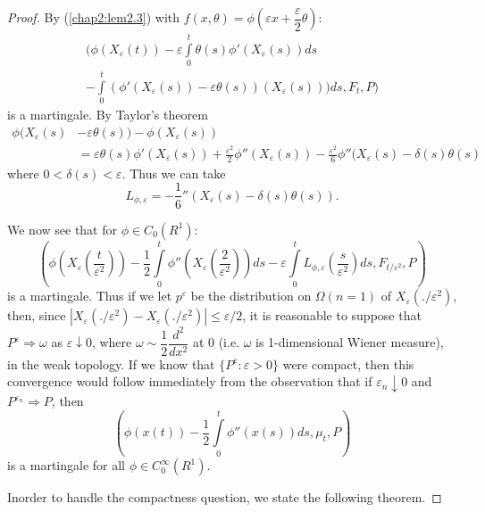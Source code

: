 \begin{proof}
By (\ref{chap2:lem2.3}) with $f(x, \theta) = \phi (\varepsilon x +
\dfrac{\varepsilon }{2} \theta)$: 
\begin{multline*}
(\phi (X_\varepsilon (t)) - \varepsilon \int\limits^t_0 \theta(s)\phi'
(X_\varepsilon (s))ds \\
- \int\limits^t_0 (\phi '
(X_\varepsilon (s)) - \varepsilon\theta(s))(X_\varepsilon(s)))ds, F_t , P) 
\end{multline*}
is a martingale. By Taylor's theorem
\begin{align*}
\phi(X_\varepsilon(s) & - \varepsilon \theta(s)) - \phi(X_\varepsilon (s)) \\ 
& = \varepsilon \theta(s) \phi' (X_\varepsilon (s)) +
\frac{\varepsilon^2}{2} \phi''(X_\varepsilon(s)) -
\frac{\varepsilon^2}{6} \phi''(X_\varepsilon (s)- \delta(s)\theta(s) 
\end{align*} 
where $0 < \delta(s) < \varepsilon$. Thus we can take
$$
L_{\phi , \varepsilon} = - \frac{1}{6}'' (X_\varepsilon(s) - \delta(s)
\theta(s)). 
$$

We now see that for $\phi \in C_0 (R^1)$:
$$ 
(\phi(X_\varepsilon (\frac{t}{\varepsilon^2})) - \frac{1}{2}
\int\limits^t_0 \phi'' (X_\varepsilon (\frac{2}{\varepsilon^2}))ds -
\varepsilon \int\limits^t_0 L_{\phi , \varepsilon}
(\frac{s}{\varepsilon^2})ds, F_{t/  \varepsilon^2}, P) 
$$
is a martingale. Thus if we let $p^\varepsilon$ be the distribution on
$\Omega(n = 1)$ of $X_\varepsilon (./ \varepsilon^2)$, then, since $|
X_\varepsilon (./ \varepsilon^2)-X_{\varepsilon} (./\varepsilon^2) |
\leq \varepsilon /2$, it is
reasonable to suppose that $P^\varepsilon \Rightarrow \omega$ as
$\varepsilon \downarrow 0$, where $\omega \sim \dfrac{1}{2}
\dfrac{d^2}{dx^2}$ at 0 (i.e. $\omega$ is 1-dimensional Wiener
measure), in the weak topology. If we know that $\{ P^\varepsilon :
\varepsilon > 0\}$ were compact, then this convergence would follow
immediately from the observation that if $\varepsilon _n \downarrow 0$
and $P^{\varepsilon_n} \Rightarrow P$, then  
$$
(\phi(x(t)) - \frac{1}{2} \int\limits^t_0 \phi''(x(s)) ds, \mu_t , P) 
$$
is a martingale for all $\phi \in C^\infty_0(R^1)$. 

In\pageoriginale order to handle the compactness question, we state
the following theorem.  
\end{proof}

